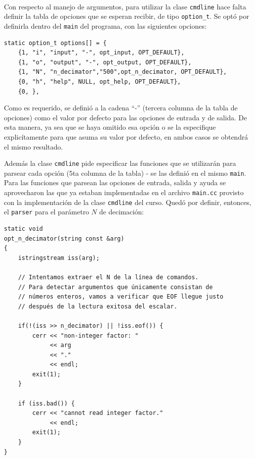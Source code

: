 \documentclass[11pt, spanish]{report}
\begin{document}
\paragraph{} Con respecto al manejo de argumentos, para utilizar la clase \texttt{cmdline} hace falta definir la tabla de opciones que se esperan recibir, de tipo \texttt{option\_t}. Se optó por definirla dentro del \texttt{main} del programa, con las siguientes opciones:

\lstset{language=C++}
\begin{lstlisting}[frame=single]
static option_t options[] = {
	{1, "i", "input", "-", opt_input, OPT_DEFAULT},
	{1, "o", "output", "-", opt_output, OPT_DEFAULT},
	{1, "N", "n_decimator","500",opt_n_decimator, OPT_DEFAULT},
	{0, "h", "help", NULL, opt_help, OPT_DEFAULT},
	{0, },
\end{lstlisting}

Como es requerido, se definió a la cadena ``-'' (tercera columna de la tabla de opciones) como el valor por defecto para las opciones de entrada y de salida. De esta manera, ya sea que se haya omitido esa opción o se la especifique explicítamente para que asuma su valor por defecto, en ambos casos se  obtendrá el mismo resultado.

Además la clase \texttt{cmdline} pide especificar las funciones que se utilizarán para parsear cada opción (5ta columna de la tabla) - se las definió en el mismo \texttt{main}. Para las funciones que parsean las opciones de entrada, salida y ayuda se aprovecharon las que ya estaban implementadas en el archivo \texttt{main.cc} provisto con la implementación de la clase \texttt{cmdline} del curso. Quedó por definir, entonces, el \texttt{parser} para el parámetro $N$ de decimación:


\lstset{language=C++} %
\begin{lstlisting}[frame=single]
static void
opt_n_decimator(string const &arg)
{
	istringstream iss(arg);

	// Intentamos extraer el N de la línea de comandos.
	// Para detectar argumentos que únicamente consistan de
	// números enteros, vamos a verificar que EOF llegue justo
	// después de la lectura exitosa del escalar.
	
	if(!(iss >> n_decimator) || !iss.eof()) {
		cerr << "non-integer factor: "
		     << arg
		     << "."
		     << endl;
		exit(1);
	}

	if (iss.bad()) {
		cerr << "cannot read integer factor."
		     << endl;
		exit(1);
	}
}
\end{lstlisting}
\end{document}
